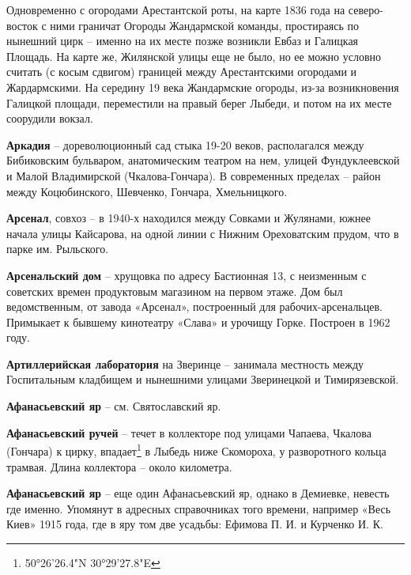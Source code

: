 Одновременно с огородами Арестантской роты, на карте 1836 года на северо-восток с ними граничат Огороды Жандармской команды, простираясь по нынешний цирк – именно на их месте позже возникли Евбаз и Галицкая Площадь. На карте же, Жилянской улицы еще не было, но ее можно условно считать (с косым сдвигом) границей между Арестантскими огородами и Жардармскими. На середину 19 века Жандармские огороды, из-за возникновения Галицкой площади, переместили на правый берег Лыбеди, и потом на их месте соорудили вокзал.

\newpage

\textbf{Аркадия} – дореволюционный сад стыка 19-20 веков, располагался между Бибиковским бульваром, анатомическим театром на нем, улицей Фундуклеевской и Малой Владимирской (Чкалова-Гончара). В современных пределах – район между Коцюбинского, Шевченко, Гончара, Хмельницкого.\\ 

\medskip


\textbf{Арсенал}, совхоз – в 1940-х находился между Совками и Жулянами, южнее начала улицы Кайсарова, на одной линии с Нижним Ореховатским прудом, что в парке им. Рыльского.\\

\medskip


\textbf{Арсенальский дом} – хрущовка по адресу Бастионная 13, с неизменным с советских времен продуктовым магазином на первом этаже. Дом был ведомственным, от завода «Арсенал», построенный для рабочих-арсенальцев. Примыкает к бывшему кинотеатру «Слава» и урочищу Горке. Построен в 1962 году.\\

\medskip


\textbf{Артиллерийская лаборатория} на Зверинце – занимала местность между Госпитальным кладбищем и нынешними улицами Зверинецкой и Тимирязевской.\\

\medskip


\textbf{Афанасьевский яр} – см. Святославский яр.\\

\medskip


\textbf{Афанасьевский ручей} – течет в коллекторе под улицами Чапаева, Чкалова (Гончара) к цирку, впадает\footnote{50°26'26.4"N 30°29'27.8"E} в Лыбедь ниже Скомороха, у разворотного кольца трамвая. Длина коллектора – около километра.\\

\medskip


\textbf{Афанасьевский яр} – еще один Афанасьевский яр, однако в Демиевке, невесть где именно. Упомянут в адресных справочниках того времени, например «Весь Киев» 1915 года, где в яру том две усадьбы: Ефимова П. И. и Курченко И. К.

